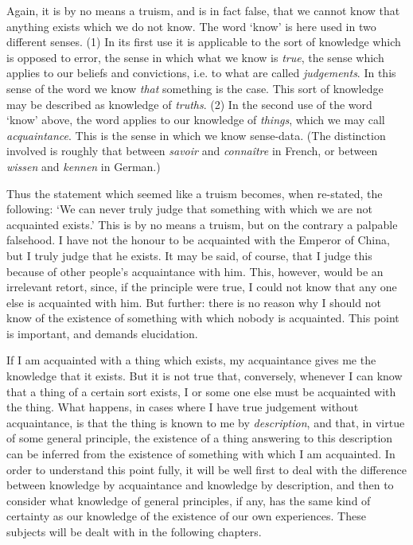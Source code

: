 \documentclass[oneside,letterpaper,12pt]{book}
\begin{document}
Again, it is by no means a truism, and is in fact false, that we cannot
know that anything exists which we do not know. The word
`know' is here used in two different
senses. (1) In its first use it is applicable to the sort of knowledge
which is opposed to error, the sense in which what we know is
\emph{true}, the sense which applies to our beliefs and convictions,
i.e. to what are called \emph{judgements}. In this sense of the word we
know \emph{that} something is the case. This sort of knowledge may be
described as knowledge of \emph{truths}. (2) In the second use of the
word `know' above, the word applies to
our knowledge of \emph{things}, which we may call \emph{acquaintance}.
This is the sense in which we know sense-data. (The distinction involved
is roughly that between \emph{savoir} and \emph{connaître} in French, or
between \emph{wissen} and \emph{kennen} in German.)

Thus the statement which seemed like a truism becomes, when re-stated,
the following: `We can never truly judge that something
with which we are not acquainted exists.' This is by no
means a truism, but on the contrary a palpable falsehood. I have not the
honour to be acquainted with the Emperor of \label{China1}China, but I truly judge
that he exists. It may be said, of course, that I judge this because of
other people's acquaintance with him. This, however,
would be an irrelevant retort, since, if the principle were true, I
could not know that any one else is acquainted with him. But further:
there is no reason why I should not know of the existence of something
with which nobody is acquainted. This point is important, and demands
elucidation.

If I am acquainted with a thing which exists, my acquaintance gives me
the knowledge that it exists. But it is not true that, conversely,
whenever I can know that a thing of a certain sort exists, I or some one
else must be acquainted with the thing. What happens, in cases where I
have true judgement without acquaintance, is that the thing is known to
me by \emph{description}, and that, in virtue of some general principle,
the existence of a thing answering to this description can be inferred
from the existence of something with which I am acquainted. In order to
understand this point fully, it will be well first to deal with the
difference between knowledge by acquaintance and knowledge by
description, and then to consider what knowledge of general principles,
if any, has the same kind of certainty as our knowledge of the existence
of our own experiences. These subjects will be dealt with in the
following chapters.
\end{document}
